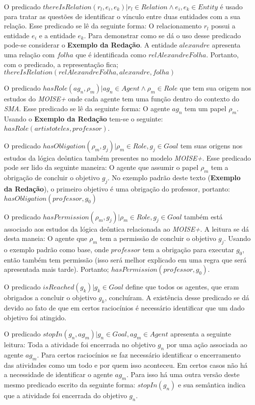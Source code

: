 O predicado $thereIsRelation(r_l,e_i,e_k) | r_l \in Relation \wedge  e_i, e_k \in Entity$ é usado para tratar as questões de identificar o vínculo entre duas entidades com a sua relação. Esse predicado se lê da seguinte forma: O relacionamento $r_l$ possui a entidade $e_i$ e a entidade $e_k$. Para demonstrar como se dá o uso desse predicado pode-se considerar o \textbf{Exemplo da Redação}. A entidade $alexandre$ apresenta uma relação com $folha$ que é identificada como $relAlexandreFolha$. Portanto, com o predicado, a representação fica; $thereIsRelation(relAlexandreFolha,alexandre,folha)$

O predicado $hasRole(ag_n,\rho_m) | ag_n \in Agent \wedge \rho_m \in Role$ que tem sua origem nos estudos do \textit{MOISE+} onde 
cada agente tem uma função dentro do contexto do \textit{SMA}. Esse predicado se lê da seguinte forma: O agente $ag_n$ tem um
papel $\rho_m$. Usando o \textbf{Exemplo da Redação} tem-se o seguinte: $hasRole(artistoteles,professor)$. 

O predicado $hasObligation(\rho_m,g_j) | \rho_m \in Role, g_j \in Goal $ tem suas origens nos estudos da lógica deôntica também 
presentes no modelo \textit{MOISE+}. Esse predicado pode ser lido da seguinte maneira: O agente que assumir o papel $\rho_m$ tem a 
obrigação de concluir o objetivo $g_j$. No exemplo padrão deste texto (\textbf{Exemplo da Redação}), o primeiro objetivo é uma
obrigação do professor, portanto: $hasObligation(professor,g_0)$

O predicado $hasPermission(\rho_m, g_j) | \rho_m \in Role, g_j \in Goal $ também está associado aos estudos da lógica deôntica
relacionada ao \textit{MOISE+}. A leitura se dá desta maneia: O agente que $\rho_m$ tem a permissão de concluir o objetivo $g_j$.
Usando o exemplo padrão como base, onde $professor$ tem a obrigação para executar $g_0$, então também tem permissão (isso
será melhor explicado em uma regra que será apresentada mais tarde). Portanto; $hasPermission(professor,g_0)$.  

O predicado $isReached(g_k) | g_k \in Goal $ define que todos os agentes, que eram obrigados a concluir o objetivo $g_k$, concluíram. A 
existência desse predicado se dá devido ao fato de que em certos raciocínios é necessário identificar que um dado objetivo 
foi atingido. 

O predicado $stopIn(g_n, ag_m) | g_n \in Goal, ag_m \in Agent$ apresenta a seguinte leitura: Toda a atividade foi encerrada no
objetivo $g_n$ por uma ação associada ao agente $ag_m$. Para certos raciocínios se faz necessário identificar o encerramento
das atividades como um todo e por quem isso aconteceu. Em certos casos não há a necessidade de identificar o agente $ag_m$. Para
isso há uma outra versão deste mesmo predicado escrito da seguinte forma: $stopIn(g_n)$ e sua semântica indica que a atividade 
foi encerrada do objetivo $g_n$.

